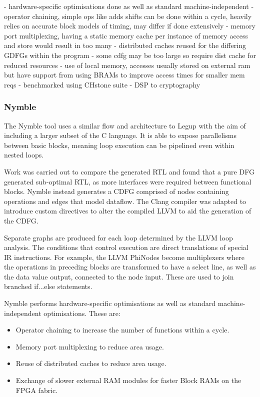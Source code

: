 - hardware-specific optimisations done as well as standard machine-independent
- operator chaining, simple ops like adds shifts can be done within a cycle, heavily relies on accurate block models of timing, may differ if done extensively
- memory port multiplexing, having a static memory cache per instance of memory access and store would result in too many
- distributed caches reused for the differing GDFGs within the program
- some cdfg may be too large so require dist cache for reduced resources
- use of local memory, accesses usually stored on external ram but have support from using BRAMs to improve access times for smaller mem reqs
- benchmarked using CHstone suite - DSP to cryptography
\fi

\pagebreak

\subsubsection{Nymble}
The Nymble \cite{nymble_intro} tool uses a similar flow and architecture to Legup with the aim of including a larger subset of the C language. It is able to expose parallelisms between basic blocks, meaning loop execution can be pipelined even within nested loops. %

Work was carried out to compare the generated RTL and found that a pure DFG generated sub-optimal RTL, as more interfaces were required between functional blocks. %
Nymble instead generates a CDFG comprised of nodes containing operations and edges that model dataflow. The Clang compiler was adapted to introduce custom directives to alter the compiled LLVM to aid the generation of the CDFG. 

Separate graphs are produced for each loop determined by the LLVM loop analysis. The conditions that control execution are direct translations of special IR instructions. For example, the LLVM PhiNodes become multiplexers where the operations in preceding blocks are transformed to have a select line, as well as the data value output, connected to the node input. These are used to join branched if...else statements. %

Nymble performs hardware-specific optimisations as well as standard machine-independent optimisations. These are:
\begin{itemize}
    \item Operator chaining to increase the number of functions within a cycle.
    \item Memory port multiplexing to reduce area usage.
    \item Reuse of distributed caches to reduce area usage.
    \item Exchange of slower external RAM modules for faster Block RAMs on the FPGA fabric.
\end{itemize}

